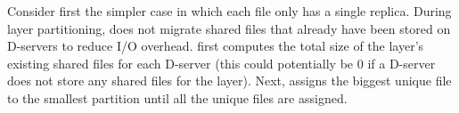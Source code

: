 %
Consider first the simpler case in which each file only has
a single replica. During layer partitioning, \sysname does not migrate shared files that already
have been stored on D-servers to reduce I/O overhead.
%
%
\sysname first computes the total size of the layer's existing shared files for each D-server (this could
potentially be 0 if a D-server does not store any shared files for the layer).
Next, \sysname 
assigns the biggest unique file to the smallest partition until all the unique files are assigned.

